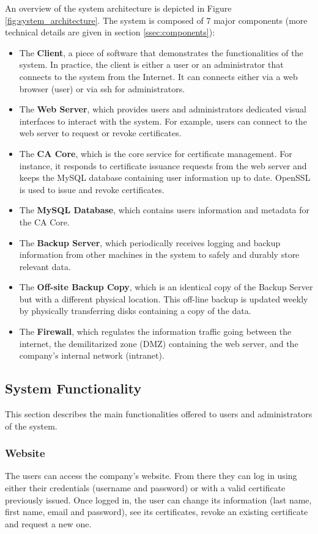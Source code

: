 \documentclass[english]{article}
\begin{document}
An overview of the system architecture is depicted in Figure \ref{fig:system_architecture}. The system is composed of 7 major components (more technical details are given in section \ref{ssec:components}):
\begin{itemize}
    \item The \textbf{Client}, a piece of software that demonstrates the functionalities of the system. In practice, the client is either a user or an administrator that connects to the system from the Internet. It can connects either via a web browser (user) or via ssh for administrators.
    \item The \textbf{Web Server}, which provides users and administrators dedicated visual interfaces to interact with the system. For example, users can connect to the web server to request or revoke certificates.
    \item The \textbf{CA Core}, which is the core service for certificate management. For instance, it responds to certificate issuance requests from the web server and keeps the MySQL database containing user information up to date. OpenSSL is used to issue and revoke certificates.
    \item The \textbf{MySQL Database}, which contains users information and metadata for the CA Core. %
    \item The \textbf{Backup Server}, which periodically receives logging and backup information from other machines in the system to safely and durably store relevant data.
    \item The \textbf{Off-site Backup Copy}, which is an identical copy of the Backup Server but with a different physical location. This off-line backup is updated weekly by physically transferring disks containing a copy of the data.
    \item The \textbf{Firewall}, which regulates the information traffic going between the internet, the demilitarized zone (DMZ) containing the web server, and the company's internal network (intranet).
\end{itemize}

\subsection{System Functionality}\label{ssec:system_func}
This section describes the main functionalities offered to users and administrators of the system.

\subsubsection{Website}
The users can access the company's website. From there they can log in using either their credentials (username and password) or with a valid certificate previously issued. Once logged in, the user can change its information (last name, first name, email and password), see its certificates, revoke an existing certificate and request a new one.
\end{document}
